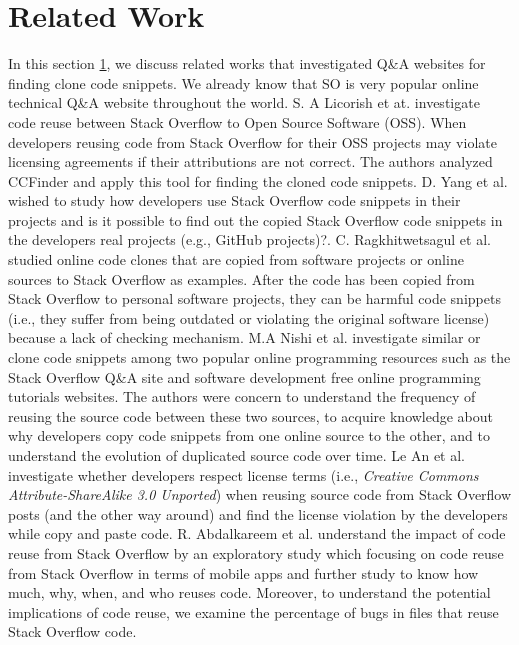 \documentclass[conference]{IEEEtran}
\begin{document}
 \section{Related Work}\label{RW}
 In this section \ref{RW}, we discuss related works that investigated Q\&A websites for finding clone code snippets. We already know that SO is very popular online technical Q\&A website throughout the world. S. A Licorish et at. \cite{b14} investigate code reuse between Stack Overflow to Open Source Software (OSS). When developers reusing code from Stack Overflow for their OSS projects may violate licensing agreements if their attributions are not correct. The authors analyzed CCFinder and apply this tool for finding the cloned code snippets. D. Yang et al. \cite{b15} wished to  study how developers use Stack Overflow code snippets in their projects and is it possible to find out the copied Stack Overflow code snippets in the developers real projects (e.g., GitHub projects)?.  C. Ragkhitwetsagul  et al. \cite{b16} studied online code clones that are copied from software projects or online sources to Stack Overflow as examples.  After the code has been copied from Stack Overflow to personal software projects, they can be harmful code snippets (i.e., they suffer from being outdated or violating the original software license) because a lack of checking mechanism.  M.A Nishi et al. \cite{b1} investigate similar or clone code snippets among two popular online programming resources such as the Stack Overflow Q\&A site and software development free online programming tutorials websites. The authors were concern to understand the frequency of reusing the source code between these two sources, to acquire knowledge about why developers copy code snippets from one online source to the other, and to understand the evolution of duplicated source code over time. Le An et al. \cite{b5} investigate whether developers respect license terms (i.e., \textit{Creative Commons Attribute-ShareAlike 3.0 Unported}) when reusing source code from Stack Overflow posts (and the other way around) and find the license violation by the developers while copy and paste code. R. Abdalkareem et al. \cite{b1} understand the impact of code reuse from Stack Overflow by an exploratory study which focusing on code reuse from Stack Overflow in terms of mobile apps and further study to know how much, why, when, and who reuses code. Moreover, to understand the potential implications of code reuse, we examine the percentage of bugs in files that reuse Stack Overflow code.
\end{document}

